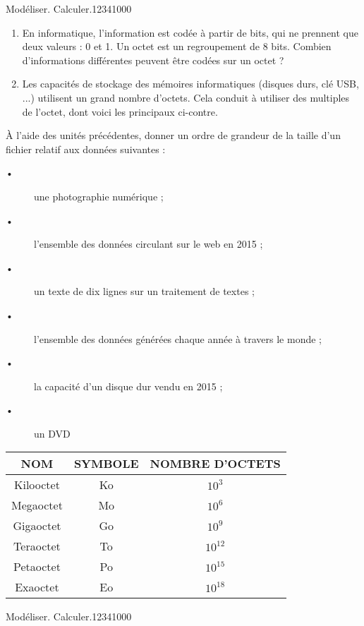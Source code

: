 \begin{pageParcoursu} 



\begin{ExoCu}{Modéliser. Calculer.}{1234}{1}{0}{0}{0}

\begin{minipage}{0.48\linewidth}

\begin{enumerate}
\item En informatique, l'information est codée à partir de bits, qui ne prennent que deux valeurs : 0 et 1. Un octet est un regroupement de 8 bits. Combien d'informations différentes peuvent être codées sur un octet ?
\item Les capacités de stockage des mémoires informatiques (disques durs, clé USB, ...) utilisent un grand nombre d'octets. Cela conduit à utiliser des multiples de l'octet, dont voici les principaux ci-contre.
\end{enumerate}

À l'aide des unités précédentes, donner un ordre de grandeur de la taille d'un fichier relatif aux données suivantes :
\begin{description}
\item[•] une photographie numérique ;
\item[•] l’ensemble des données circulant sur le web en 2015 ;
\item[•] un texte de dix lignes sur un traitement de textes ;
\item[•] l’ensemble des données générées chaque année à travers le monde ;
\item[•] la capacité d’un disque dur vendu en 2015 ;
\item[•] un DVD
\end{description}

\end{minipage}
\hfill
\begin{minipage}{0.48\linewidth}

\begin{center}
\begin{tabular}{|c|c|c|}
\hline 
NOM & SYMBOLE & NOMBRE D'OCTETS \\ 
\hline 
Kilooctet & Ko & $10^{3}$ \\ 
\hline 
Megaoctet & Mo & $10^{6}$  \\ 
\hline 
Gigaoctet& Go & $10^{9}$  \\ 
\hline 
Teraoctet & To & $10^{12}$  \\ 
\hline 
Petaoctet & Po & $10^{15}$  \\ 
\hline 
Exaoctet & Eo & $10^{18}$  \\ 
\hline 
\end{tabular} 
\end{center}

\end{minipage}
\end{ExoCu}

\begin{ExoCu}{Modéliser. Calculer.}{1234}{1}{0}{0}{0}


\end{ExoCu}
 
 
 

\end{pageParcoursu}
